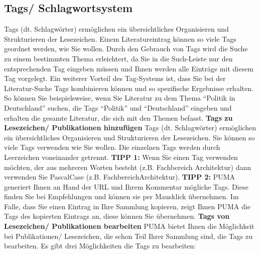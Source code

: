 \documentclass[a4paper,11pt,twoside]{scrbook}
\begin{document}
\subsection{Tags/ Schlagwortsystem}
Tags (dt. Schlagwörter) ermöglichen ein übersichtliches Organisieren und Strukturieren der Lesezeichen. Einem Literatureintrag können so viele Tags geordnet werden, wie Sie wollen. Durch den Gebrauch von Tags wird die Suche zu einem bestimmten Thema erleichtert, da Sie in die Such-Leiste nur den entsprechenden Tag eingeben müssen und Ihnen werden alle Einträge mit diesem Tag vorgelegt. Ein weiterer Vorteil des Tag-Systems ist, dass Sie bei der Literatur-Suche  Tags kombinieren können und so spezifische Ergebnisse erhalten. So können Sie beispielsweise, wenn Sie Literatur zu dem Thema \enquote{Politik in Deutschland} suchen, die Tags \enquote{Politik} und \enquote{Deutschland} eingeben und erhalten die gesamte Literatur, die sich mit den Themen befasst. 
\newline
\newline
\textbf{Tags zu Lesezeichen/ Publikationen hinzufügen}\newline
Tags (dt. Schlagwörter) ermöglichen ein übersichtliches Organisieren und Strukturieren der Lesezeichen. Sie können so viele Tags verwenden wie Sie wollen. Die einzelnen Tags werden durch Leerzeichen voneinander getrennt. \newline \textbf{TIPP 1:} Wenn Sie einen Tag verwenden möchten, der aus mehreren Worten besteht (z.B. Fachbereich Architektur) dann verwenden Sie PascalCase (z.B. FachbereichArchitektur). \newline \textbf{TIPP 2:} PUMA generiert Ihnen an Hand der URL und Ihrem Kommentar  mögliche Tags. Diese finden Sie bei Empfehlungen und können sie per Mausklick übernehmen. Im Falle, dass Sie einen Eintrag in Ihre Sammlung kopieren, zeigt Ihnen PUMA die Tags des kopierten Eintrags an, diese können Sie übernehmen.%
\newline
\newline
\textbf{Tags von Lesezeichen/ Publikationen bearbeiten} \newline
PUMA bietet Ihnen die Möglichkeit bei Publikationen/ Lesezeichen, die schon Teil Ihrer Sammlung sind, die Tags zu bearbeiten. Es gibt drei Möglichkeiten die Tags zu bearbeiten:
\end{document}
